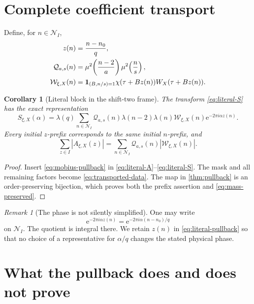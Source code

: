 \documentclass[11pt]{article}
\newtheorem{corollary}[theorem]{Corollary}
\theoremstyle{definition}
\theoremstyle{remark}
\newtheorem{remark}[theorem]{Remark}
\newcommand{\e}{\mathrm e}
\newcommand{\one}{\mathbf 1}
\begin{document}
\section{Complete coefficient transport}

Define, for \(n\in\mathcal N_I\),
\begin{align}
 z(n)&=\frac{n-n_0}{q},\notag\\
 \mathcal Q_{a,s}(n)
 &=
 \mu^2\!\left(\frac{n-2}{a}\right)
 \mu^2\!\left(\frac ns\right),\notag\\
 \mathcal W_{\xi,X}(n)
 &=
 \one_{(B,n/s)=1}
 \chi(\tau+Bz(n))W_X(\tau+Bz(n)).
\label{eq:transported-data}
\end{align}

\begin{corollary}[Literal block in the shift-two frame]
\label{cor:literal}
The transform \eqref{eq:literal-S} has the exact representation
\begin{equation}
\boxed{
 S_{\xi,X}(\alpha)
 =
 \lambda(q)
 \sum_{n\in\mathcal N_I}
 \mathcal Q_{a,s}(n)
 \lambda(n-2)\lambda(n)
 \mathcal W_{\xi,X}(n)
 \e^{-2\pi i\alpha z(n)}.}
\label{eq:literal-pullback}
\end{equation}
Every initial \(z\)-prefix corresponds to the same initial
\(n\)-prefix, and
\begin{equation}
 \sum_{z\in I}|A_{\xi,X}(z)|
 =
 \sum_{n\in\mathcal N_I}
 \mathcal Q_{a,s}(n)|\mathcal W_{\xi,X}(n)|.
\label{eq:mass-preserved}
\end{equation}
\end{corollary}

\begin{proof}
Insert \eqref{eq:mobius-pullback} in
\eqref{eq:literal-A}--\eqref{eq:literal-S}.  The mask and all
remaining factors become \eqref{eq:transported-data}.  The map in
\cref{thm:pullback} is an order-preserving bijection, which proves
both the prefix assertion and \eqref{eq:mass-preserved}.
\end{proof}

\begin{remark}[The phase is not silently simplified]
One may write
\[
 \e^{-2\pi i\alpha z(n)}
 =
 \e^{-2\pi i\alpha(n-n_0)/q}
\]
on \(\mathcal N_I\).  The quotient is integral there.  We retain
\(z(n)\) in \eqref{eq:literal-pullback} so that no choice of a
representative for \(\alpha/q\) changes the stated physical phase.
\end{remark}

\section{What the pullback does and does not prove}
\end{document}
